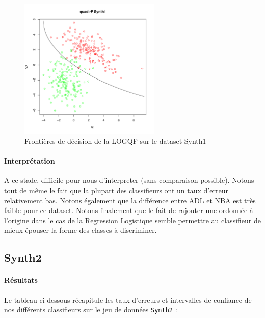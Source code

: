 \documentclass{report}
\begin{document}
\begin{figure}[ht!]
\begin{center}
    \includegraphics[width=0.6\textwidth]{results/quadlrf/quadlrf-Synth1.pdf}
    \caption{Frontières de décision de la LOGQF sur le dataset Synth1}
\end{center}
\end{figure}


\clearpage
\paragraph{Interprétation}
A ce stade, difficile pour nous d'interpreter (sans comparaison possible). Notons tout de même le fait que la plupart des classifieurs ont un taux d'erreur relativement bas. Notons également que la différence entre ADL et NBA est très faible pour ce dataset. Notons finalement que le fait de rajouter une ordonnée à l'origine dans le cas de la Regression Logistique semble permettre au classifieur de mieux épouser la forme des classes à discriminer.

\newpage
\subsection{Synth2}
\paragraph{Résultats}
Le tableau ci-dessous récapitule les taux d'erreurs et intervalles de confiance de nos différents classifieurs sur le jeu de données \verb+Synth2+ :
\end{document}
